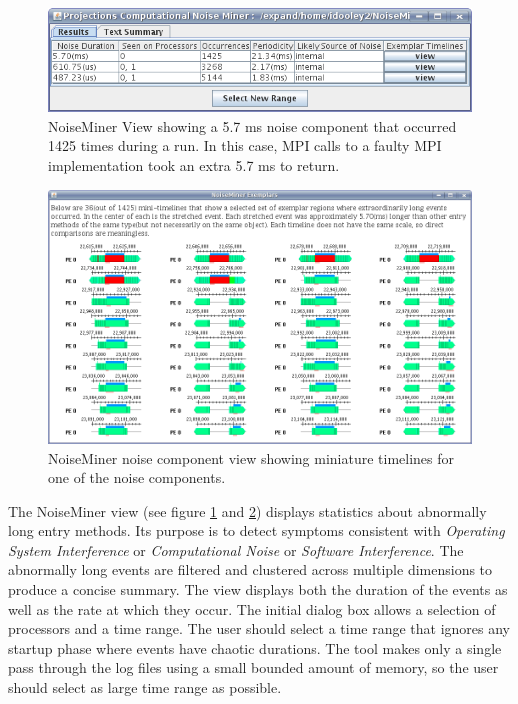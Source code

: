 
\begin{figure}[!h]
\center
\includegraphics[width=6.0in]{fig/NoiseMiner1}
\caption{NoiseMiner View showing a 5.7 ms noise component that
occurred 1425 times during a run. In this case, MPI calls to a faulty
MPI implementation took an extra 5.7 ms to return. \label{noiseminer1}
}
\end{figure}

\begin{figure}[!h]
\center
\includegraphics[width=6.0in]{fig/NoiseMiner2}
\caption{NoiseMiner noise component view showing miniature timelines for 
one of the noise components.\label{noiseminer2} }
\end{figure}

The NoiseMiner view (see figure \ref{noiseminer1} and
\ref{noiseminer2}) displays statistics about abnormally long entry
methods. Its purpose is to detect symptoms consistent with
\textit{Operating System Interference} or \textit{Computational
Noise} or \textit{Software Interference}. The abnormally long events
are filtered and clustered across multiple dimensions to produce a
concise summary. The view displays both the duration of the events as
well as the rate at which they occur. The initial dialog box allows a
selection of processors and a time range. The user should select a
time range that ignores any startup phase where events have chaotic
durations. The tool makes only a single pass through the log files
using a small bounded amount of memory, so the user should select as
large time range as possible.
 
